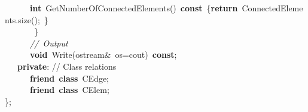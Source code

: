 {{%
\ \ \ \ \ \ \textbf{int}\ GetNumberOfConnectedElements()\ \textbf{const}\ \{\textbf{return}\ ConnectedElements.size();\ \}\ \ \ \ \ \\
\ \ \ \ \ \ \ \}\ \ \ \ \ \\
\ \ \ \ \ \ \textsl{//\ Output}\\
\ \ \ \ \ \ \textbf{void}\ Write(ostream\&\ os=cout)\ \textbf{const};\\
\ \ \ \textbf{private}: // Class relations\\
\ \ \ \ \ \ \textbf{friend}\ \textbf{class}\ CEdge;\\
\ \ \ \ \ \ \textbf{friend}\ \textbf{class}\ CElem;\\
\};\\
}
 }
\normalfont\normalsize
